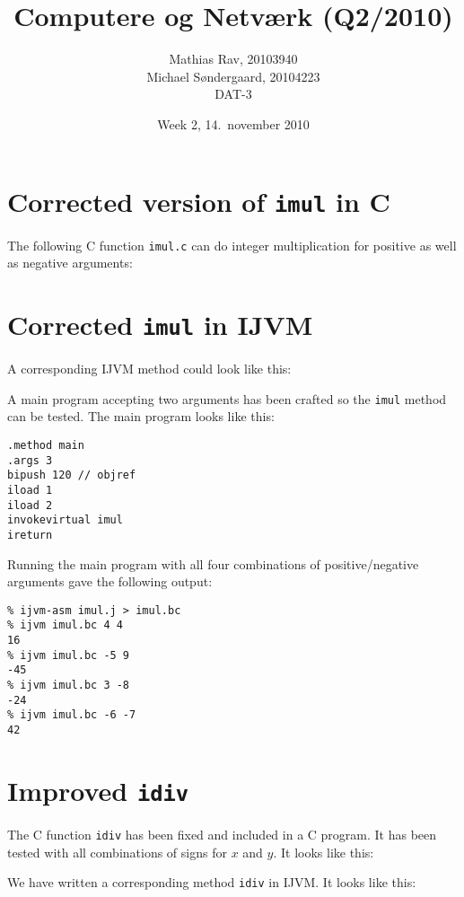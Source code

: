 \documentclass[12pt,a4paper]{article}
\title{Computere og Netværk (Q2/2010)}
\author{Mathias Rav, 20103940 \\
		Michael Søndergaard, 20104223 \\
		DAT-3}
\date{Week 2, 14.\ november 2010}
\newcommand{\imul}{\texttt{imul}}
\begin{document}
\maketitle

\section{Corrected version of \imul{} in C}

The following C function \texttt{imul.c} can do integer multiplication for
positive as well as negative arguments:

\lstset{language=C}


\section{Corrected \imul{} in IJVM}

A corresponding IJVM method could look like this:

\lstset{language=JVMIS}


A main program accepting two arguments has been crafted so the \texttt{imul}
method can be tested. The main program looks like this:

\begin{lstlisting}
.method main
.args 3
bipush 120 // objref
iload 1
iload 2
invokevirtual imul
ireturn
\end{lstlisting}

Running the main program with all four combinations of positive/negative
arguments gave the following output:

\lstset{language=sh,numbers=none}
\begin{lstlisting}
% ijvm-asm imul.j > imul.bc
% ijvm imul.bc 4 4
16
% ijvm imul.bc -5 9
-45
% ijvm imul.bc 3 -8
-24
% ijvm imul.bc -6 -7
42
\end{lstlisting}
\section{Improved \texttt{idiv}}

The C function \texttt{idiv} has been fixed and included in a C program. It has
been tested with all combinations of signs for $x$ and $y$. It looks like this:

\lstset{language=C,numbers=left}


We have written a corresponding method \texttt{idiv} in IJVM. It looks like
this:
\end{document}

